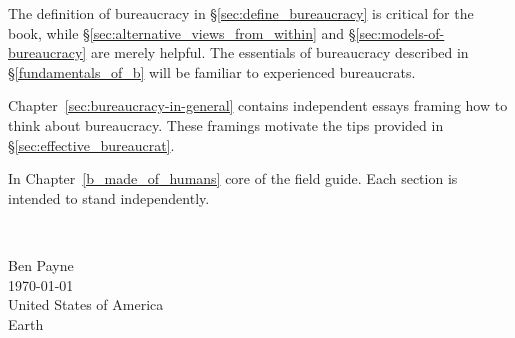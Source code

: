 

The definition of bureaucracy in \S\ref{sec:define_bureaucracy} is critical for the book, while \S\ref{sec:alternative_views_from_within} and \S\ref{sec:models-of-bureaucracy} are merely helpful. The essentials of bureaucracy described in \S\ref{fundamentals_of_b} will be familiar to experienced bureaucrats. 

Chapter~\ref{sec:bureaucracy-in-general} contains independent essays framing how to think about bureaucracy. These framings motivate the tips provided in \S\ref{sec:effective_bureaucrat}.

In Chapter~\ref{b_made_of_humans} core of the field guide. Each section is intended to stand independently. %

\ \\

\begin{flushright}
Ben Payne\\
\today\\
United States of America\\
Earth
\end{flushright}


